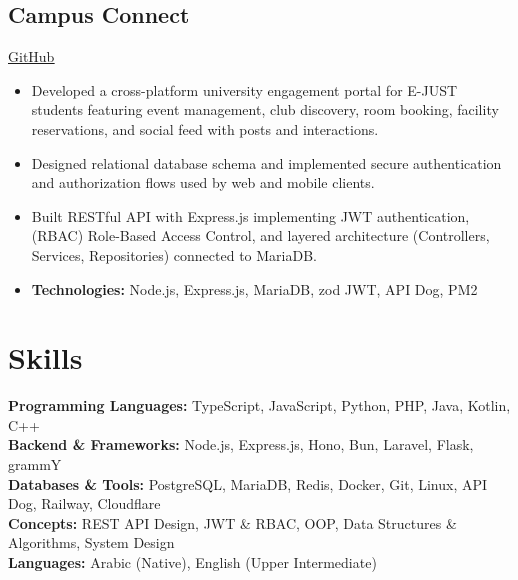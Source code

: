 \documentclass[11pt,a4paper]{article}
\begin{document}
\subsection{Campus Connect}\href{https://github.com/Amr-Ma7moud/CampusConnect}{\underline{GitHub}} 
\begin{itemize}
    \item Developed a cross-platform university engagement portal for E-JUST students featuring event management, club discovery, room booking, facility reservations, and social feed with posts and interactions.
    \item Designed relational database schema and implemented secure authentication and authorization flows used by web and mobile clients.
    \item Built RESTful API with Express.js implementing JWT authentication, (RBAC) Role-Based Access Control, and layered architecture (Controllers, Services, Repositories) connected to MariaDB.
    \item \textbf{Technologies:} Node.js, Express.js, MariaDB, zod JWT, API Dog, PM2
\end{itemize}
\section{Skills}
\textbf{Programming Languages:} TypeScript, JavaScript, Python, PHP, Java, Kotlin, C++ \\
\textbf{Backend \& Frameworks:} Node.js, Express.js, Hono, Bun, Laravel, Flask, grammY \\
\textbf{Databases \& Tools:} PostgreSQL, MariaDB, Redis, Docker, Git, Linux, API Dog, Railway, Cloudflare \\
\textbf{Concepts:} REST API Design, JWT \& RBAC, OOP, Data Structures \& Algorithms, System Design \\
\textbf{Languages:} Arabic (Native), English (Upper Intermediate)
\end{document}
